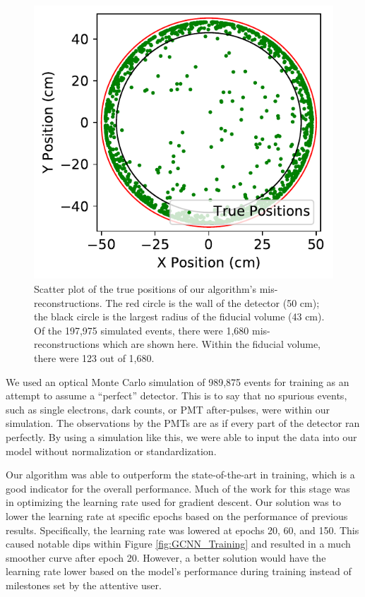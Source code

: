 \documentclass[../thesis.tex]{subfiles}
\begin{document}
\begin{figure}
	\centering
	\includegraphics[width=\linewidth]{figures/gcnn_Delaunay-Prenoise_1cm-err.pdf}
	\caption{
	Scatter plot of the true positions of our algorithm's mis-reconstructions.
	The red circle is the wall of the detector (50 cm); the black circle is the largest radius of the fiducial volume (43 cm).
	Of the 197,975 simulated events, there were 1,680 mis-reconstructions which are shown here.
	Within the fiducial volume, there were 123 out of 1,680.
	}
	\label{fig:1cm_Counts}
\end{figure}

\par We used an optical Monte Carlo simulation of 989,875 events for training as an attempt to assume a “perfect” detector.
This is to say that no spurious events, such as single electrons, dark counts, or PMT after-pulses, were within our simulation.
The observations by the PMTs are as if every part of the detector ran perfectly.
By using a simulation like this, we were able to input the data into our model without normalization or standardization.

\par Our algorithm was able to outperform the state-of-the-art in training, which is a good indicator for the overall performance.
Much of the work for this stage was in optimizing the learning rate used for gradient descent.
Our solution was to lower the learning rate at specific epochs based on the performance of  previous results.
Specifically, the learning rate was lowered at epochs 20, 60, and 150.
This caused notable dips within Figure \ref{fig:GCNN_Training} and resulted in a much smoother curve after epoch 20.
However, a better solution would have the learning rate lower based on the model's performance during training instead of milestones set by the attentive user.
\end{document}
